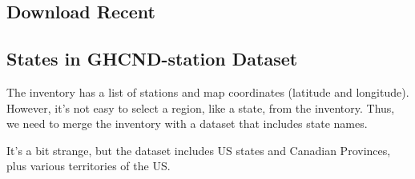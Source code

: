 \documentclass{article}\usepackage[]{graphicx}\usepackage[]{xcolor}
\begin{document}
\subsection{Download Recent}

\subsection{States in GHCND-station Dataset}

The inventory has a list of stations and map coordinates (latitude and longitude). However, it's not easy to select a region, like a state, from the inventory. Thus, we need to merge the inventory with a dataset that includes state names.

It's a bit strange, but the dataset includes US states and Canadian Provinces, plus various territories of the US. 
\end{document}
